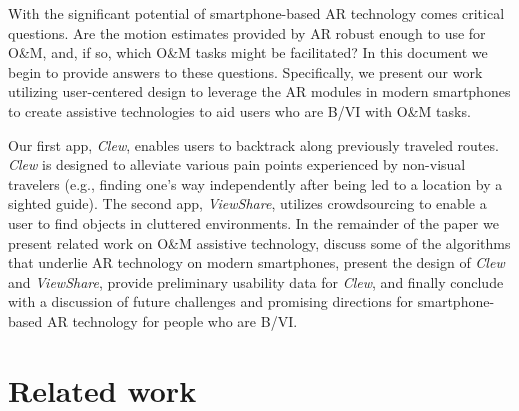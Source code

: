 \documentclass[chi_draft]{sigchi}
\newcommand{\BVI}{B/VI\xspace}
\newcommand{\OM}{O\&M\xspace}
\begin{document}
With the significant potential of smartphone-based AR technology comes critical questions.  Are the motion estimates provided by AR robust enough to use for \OM, and, if so, which \OM tasks might be facilitated?  In this document we begin to provide answers to these questions.  Specifically, we present our work utilizing user-centered design to leverage the AR modules in modern smartphones to create assistive technologies to aid users who are \BVI with \OM tasks.%

Our first app, \emph{Clew}, enables users to backtrack along previously traveled routes.  \emph{Clew} is designed to alleviate various pain points experienced by non-visual travelers (e.g., finding one's way independently after being led to a location by a sighted guide).  The second app, \emph{ViewShare}, utilizes crowdsourcing to enable a user to find objects in cluttered environments.  In the remainder of the paper we present related work on \OM assistive technology, discuss some of the algorithms that underlie AR technology on modern smartphones, present the design of \emph{Clew} and \emph{ViewShare}, provide preliminary usability data for \emph{Clew}, and finally conclude with a discussion of future challenges and promising directions for smartphone-based AR technology for people who are \BVI.   

\section{Related work}
\end{document}
